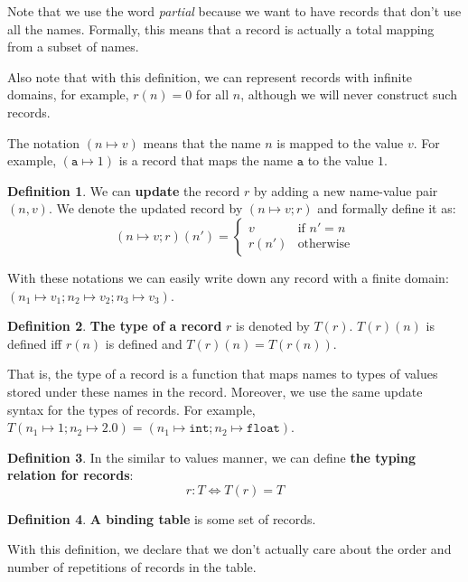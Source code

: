 \documentclass[14pt]{constructor-thesis}
\theoremstyle{definition}
\newtheorem{definition}{Definition}
\begin{document}
Note that we use the word \textit{partial} because we want to have records that don't use all the names. Formally, this means that a record is actually a total mapping from a subset of names.

Also note that with this definition, we can represent records with infinite domains, for example, $r(n) = 0$ for all $n$, although we will never construct such records.

The notation $(n \mapsto v)$ means that the name $n$ is mapped to the value $v$. For example, $(\mathtt{a} \mapsto 1)$ is a record that maps the name $\mathtt{a}$ to the value $1$.

\begin{definition}
  We can \textbf{update} the record $r$ by adding a new name-value pair $(n, v)$. We denote the updated record by $(n \mapsto v; r)$ and formally define it as:
  $$
  (n \mapsto v; r)(n') = \begin{cases}
    v & \text{if } n' = n \\
    r(n') & \text{otherwise}
  \end{cases}
  $$
\end{definition}

With these notations we can easily write down any record with a finite domain: $(n_1 \mapsto v_1; n_2 \mapsto v_2; n_3 \mapsto v_3)$.

\begin{definition}
  \textbf{The type of a record} $r$ is denoted by $T(r)$. $T(r)(n)$ is defined iff $r(n)$ is defined and $T(r)(n) = T(r(n))$.
\end{definition}

That is, the type of a record is a function that maps names to types of values stored under these names in the record. Moreover, we use the same update syntax for the types of records. For example, $T(n_1 \mapsto 1; n_2 \mapsto 2.0) = (n_1 \mapsto \mathtt{int}; n_2 \mapsto \mathtt{float})$.

\begin{definition}
  In the similar to values manner, we can define \textbf{the typing relation for records}:
  $$ r : T \Longleftrightarrow T(r) = T $$
\end{definition}

\begin{definition}
  \textbf{A binding table} is some set of records.
\end{definition}

With this definition, we declare that we don't actually care about the order and number of repetitions of records in the table.
\end{document}

